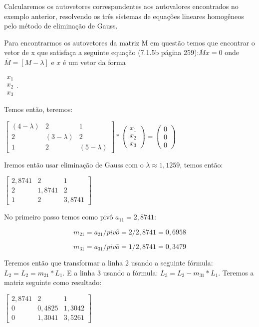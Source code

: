 \begin{example}
Calcularemos os autovetores correspondentes aos autovalores encontrados no exemplo anterior, resolvendo os três sistemas de equações lineares homogêneos pelo método de eliminação de Gauss. 

Para encontrarmos os autovetores da matriz M em questão temos que encontrar o vetor de x que satisfaça a seguinte equação (7.1.5b página 259):$\overline{M}x=0$ onde $\overline{M}=[M-\lambda]$ e $x$ é um vetor da forma

$\begin{array}{c}
x_{1}\\
x_{2}\\
x_{3}\end{array}$.

Temos então, teremos:

$\left[\begin{array}{ccc}
(4-\lambda) & 2 & 1\\
2 & (3-\lambda) & 2\\
1 & 2 & (5-\lambda)\end{array}\right]*\left(\begin{array}{c}
x_{1}\\
x_{2}\\
x_{3}\end{array}\right)=\left(\begin{array}{c}
0\\
0\\
0\end{array}\right)$

Iremos então usar eliminação de Gauss com o $\lambda\approx 1,1259$, temos então:

$\left[\begin{array}{ccc}
2,8741 & 2 & 1\\
2 & 1,8741 & 2\\
1 & 2 & 3,8741\end{array}\right]$

No primeiro passo temos como pivô $a_{11}=2,8741$:

$$m_{21}=a_{21}/piv\hat{o}=2/2,8741=0,6958$$

$$m_{31}=a_{31}/piv\hat{o}=1/2,8741=0,3479$$

Teremos então que transformar a linha 2 usando a seguinte fórmula: $L_{2}=L_{2}=m_{21}*L_{1}$. E a linha 3 usando a fórmula: $L_{3}=L_{3}-m_{31}*L_{1}$. Teremos a matriz seguinte como resultado:

$\left[\begin{array}{ccc}
2,8741 & 2 & 1\\
0 & 0,4825 & 1,3042\\
0 & 1,3041 & 3,5261\end{array}\right]$


\end{example}
